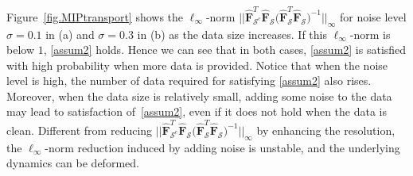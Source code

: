 \documentclass[a4paper,11pt]{article}
\begin{document}
Figure~\ref{fig.MIPtransport} shows the $\ell_\infty$-norm  $||\widehat{\mathbf{F}}_{\mathcal{S}^c}^T\widehat{\mathbf{F}}_{\mathcal{S}}\big(\widehat{\mathbf{F}}_{\mathcal{S}}^T\widehat{\mathbf{F}}_{\mathcal{S}}\big)^{-1}||_\infty$ for noise level $\sigma=0.1$ in (a) and $\sigma=0.3$ in (b) as the data size increases. If this $\ell_\infty$-norm is below $1$, \eqref{assum2} holds. Hence we can see that in both cases, \eqref{assum2} is satisfied with high probability when more data is provided. Notice that when the noise level is high, the number of data required for satisfying  \eqref{assum2} also rises. Moreover,  when the data size is relatively small, adding some noise to the data may lead to  satisfaction of~\eqref{assum2}, even if it does not hold when the data is clean. Different from reducing $||\widehat{\mathbf{F}}_{\mathcal{S}^c}^T\widehat{\mathbf{F}}_{\mathcal{S}}\big(\widehat{\mathbf{F}}_{\mathcal{S}}^T\widehat{\mathbf{F}}_{\mathcal{S}}\big)^{-1}||_\infty$ by  enhancing the resolution, the $\ell_\infty$-norm reduction induced by adding noise is unstable, and the underlying dynamics can be deformed.    
\end{document}
